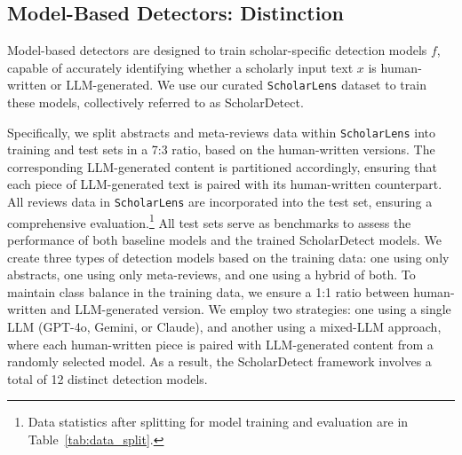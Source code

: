 \subsection{Model-Based Detectors: Distinction}
\label{sec:detectors}
Model-based detectors are designed to train scholar-specific detection models 
$f$, capable of accurately identifying whether a scholarly input text $x$ is human-written or LLM-generated. We use our curated \texttt{ScholarLens} dataset to train these models, collectively referred to as ScholarDetect.




Specifically, we split abstracts and meta-reviews data within \texttt{ScholarLens} into training and test sets in a 7:3 ratio, based on the human-written versions. 
The corresponding LLM-generated content is partitioned accordingly, ensuring that each piece of LLM-generated text is paired with its human-written counterpart. 
All reviews data in \texttt{ScholarLens} are incorporated into the test set, ensuring a comprehensive evaluation.\footnote{Data statistics after splitting for model training and evaluation are in Table~\ref{tab:data_split}.}
All test sets
serve as benchmarks to assess the performance of both baseline models and the trained ScholarDetect models.
We create three types of detection models based on the training data: one using only abstracts, one using only meta-reviews, and one using a hybrid of both.
To maintain class balance in the training data, we ensure a 1:1 ratio between human-written and LLM-generated version. We employ two strategies: one using a single LLM (GPT-4o, Gemini, or Claude), and another using a mixed-LLM approach, where each human-written piece is paired with LLM-generated content from a randomly selected model.
As a result, the ScholarDetect framework involves a total of 12 distinct detection models.


